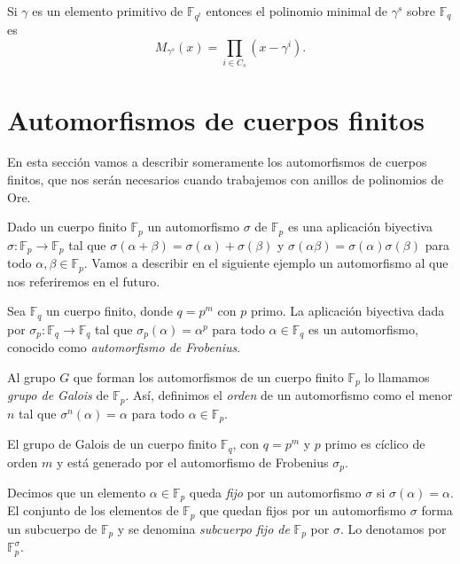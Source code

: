 \begin{theorem}
  \label{th:pol-minimal-el-primitivo}
  Si \(\gamma\) es un elemento primitivo de \(\mathbb F_{q^t}\) entonces el polinomio minimal de \(\gamma^s\) sobre \(\mathbb F_q\) es
  \[
    M_{\gamma^s}(x) = \prod_{i \in C_s}(x - \gamma^i).
  \]
\end{theorem}

\section{Automorfismos de cuerpos finitos}

En esta sección vamos a describir someramente los automorfismos de cuerpos finitos, que nos serán necesarios cuando trabajemos con anillos de polinomios de Ore.

Dado un cuerpo finito \(\mathbb F_p\) un automorfismo \(\sigma\) de \(\mathbb F_p\) es una aplicación biyectiva \(\sigma: \mathbb F_p \to \mathbb F_p\) tal que \(\sigma(\alpha + \beta) = \sigma(\alpha) + \sigma(\beta)\) y \(\sigma(\alpha \beta) = \sigma(\alpha)\sigma(\beta)\) para todo \(\alpha, \beta \in \mathbb F_p\).
Vamos a describir en el siguiente ejemplo un automorfismo al que nos referiremos en el futuro.

\begin{example}
  Sea \(\mathbb F_q\) un cuerpo finito, donde \(q = p^m\) con \(p\) primo. 
  La aplicación biyectiva dada por \(\sigma_p : \mathbb F_q \to \mathbb F_q\) tal que \(\sigma_p(\alpha) = \alpha^p\) para todo \(\alpha \in \mathbb F_q\) es un automorfismo, conocido como \emph{automorfismo de Frobenius}.
\end{example}

Al grupo \(G\) que forman los automorfismos de un cuerpo finito \(\mathbb F_p\) lo llamamos \emph{grupo de Galois} de \(\mathbb F_p\).
Así, definimos el \emph{orden} de un automorfismo como el menor \(n\) tal que \(\sigma^n(\alpha) = \alpha\) para todo \(\alpha \in \mathbb F_p\).

\begin{theorem}
  El grupo de Galois de un cuerpo finito \(\mathbb F_q\), con \(q = p^m\) y \(p\) primo es cíclico de orden \(m\) y está generado por el automorfismo de Frobenius \(\sigma_p\).
\end{theorem}

Decimos que un elemento \(\alpha \in \mathbb F_p\) queda \emph{fijo} por un automorfismo \(\sigma\) si \(\sigma(\alpha) = \alpha\).
El conjunto de los elementos de \(\mathbb F_p\) que quedan fijos por un automorfismo \(\sigma\) forma un subcuerpo de \(\mathbb F_p\) y se denomina \emph{subcuerpo fijo de} \(\mathbb F_p\) por \(\sigma\).
Lo denotamos por \(\mathbb F_p^{\sigma}\).

